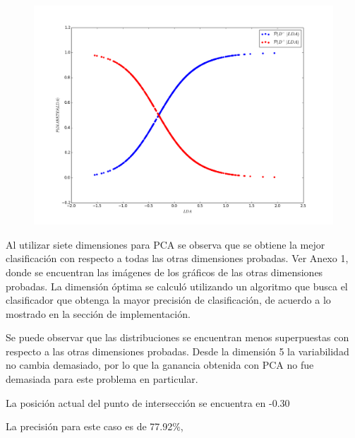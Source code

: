 \documentclass[letter, titlepage, 10pt]{article}
\begin{document}
\begin{figure}[H]
\begin{minipage}{.5\textwidth}
    \end{minipage}
    \begin{minipage}{.5\textwidth}
        \centering
        \includegraphics[width=1\linewidth]{images/CP_D7}
    \end{minipage}
\end{figure}
Al utilizar siete dimensiones para PCA se observa que se obtiene la mejor clasificación con respecto a todas las otras dimensiones probadas. Ver Anexo 1, donde se encuentran las imágenes de los gráficos de las otras dimensiones probadas. La dimensión óptima se calculó utilizando un algoritmo que busca el clasificador que obtenga la mayor precisión de clasificación, de acuerdo a lo mostrado en la sección de implementación.

Se puede observar que las distribuciones se encuentran menos superpuestas con respecto a las otras dimensiones probadas. Desde la dimensión 5 la variabilidad no cambia demasiado, por lo que la ganancia obtenida con PCA no fue demasiada para este problema en particular.

La posición actual del punto de intersección se encuentra en -0.30

La precisión para este caso es de 77.92\%,

\newpage

\newpage
\end{document}
